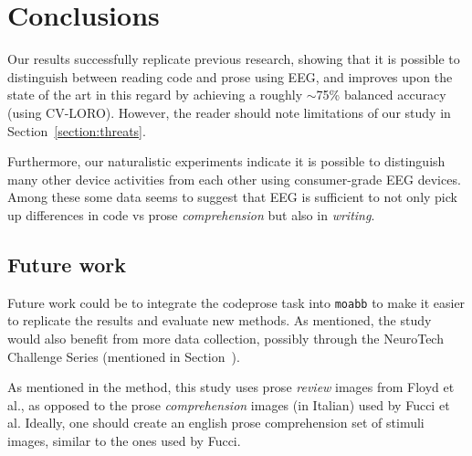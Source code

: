 \chapter{Conclusions}

Our results successfully replicate previous research, showing that it is possible to distinguish between reading code and prose using EEG, and improves upon the state of the art in this regard by achieving a roughly $\sim$75\% balanced accuracy (using CV-LORO). However, the reader should note limitations of our study in Section~\ref{section:threats}.

Furthermore, our naturalistic experiments indicate it is possible to distinguish many other device activities from each other using consumer-grade EEG devices. Among these some data seems to suggest that EEG is sufficient to not only pick up differences in code vs prose \emph{comprehension} but also in \emph{writing}.

\section{Future work}

Future work could be to integrate the codeprose task into \texttt{moabb} to make it easier to replicate the results and evaluate new methods. As mentioned, the study would also benefit from more data collection, possibly through the NeuroTech Challenge Series (mentioned in Section~\cite{section:ntcs}).

As mentioned in the method, this study uses prose \emph{review} images from Floyd et al., as opposed to the prose \emph{comprehension} images (in Italian) used by Fucci et al. Ideally, one should create an english prose comprehension set of stimuli images, similar to the ones used by Fucci.
